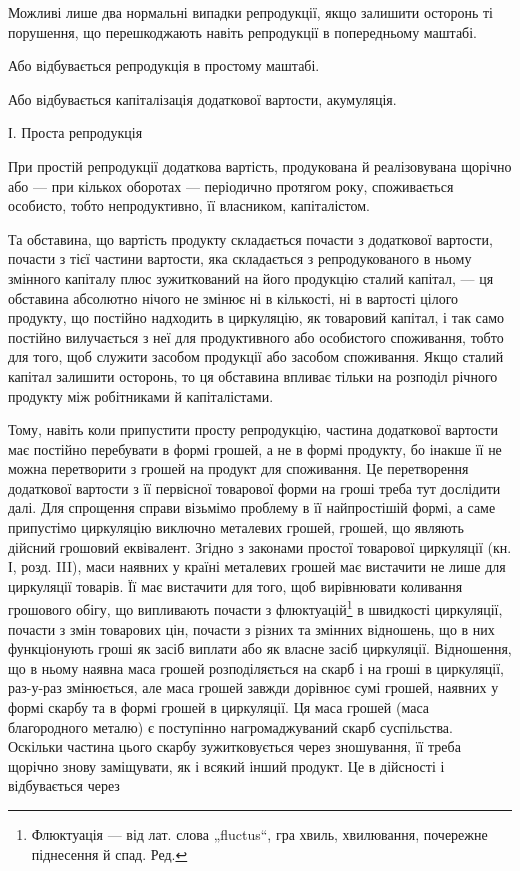 Можливі лише два нормальні випадки репродукції, якщо залишити
осторонь ті порушення, що перешкоджають навіть репродукції в попередньому
маштабі.

Або відбувається репродукція в простому маштабі.

Або відбувається капіталізація додаткової вартости, акумуляція.

І. Проста репродукція

При простій репродукції додаткова вартість, продукована й реалізовувана
щорічно або — при кількох оборотах — періодично протягом року,
споживається особисто, тобто непродуктивно, її власником, капіталістом.

Та обставина, що вартість продукту складається почасти з додаткової
вартости, почасти з тієї частини вартости, яка складається з репродукованого
в ньому змінного капіталу плюс зужиткований на його продукцію
сталий капітал, — ця обставина абсолютно нічого не змінює ні в кількості,
ні в вартості цілого продукту, що постійно надходить в циркуляцію, як
товаровий капітал, і так само постійно вилучається з неї для продуктивного
або особистого споживання, тобто для того, щоб служити засобом
продукції або засобом споживання. Якщо сталий капітал залишити осторонь,
то ця обставина впливає тільки на розподіл річного продукту між
робітниками й капіталістами.

Тому, навіть коли припустити просту репродукцію, частина додаткової
вартости має постійно перебувати в формі грошей, а не в формі
продукту, бо інакше її не можна перетворити з грошей на продукт для
споживання. Це перетворення додаткової вартости з її первісної товарової
форми на гроші треба тут дослідити далі. Для спрощення справи
візьмімо проблему в її найпростішій формі, а саме припустімо циркуляцію
виключно металевих грошей, грошей, що являють дійсний грошовий еквівалент.
Згідно з законами простої товарової циркуляції (кн. І, розд. III), маси
наявних у країні металевих грошей має вистачити не лише для
циркуляції товарів. Її має вистачити для того, щоб вирівнювати коливання
грошового обігу, що випливають почасти з флюктуацій\footnote*{
Флюктуація — від лат. слова „fluctus“, гра хвиль, хвилювання, почережне
піднесення й спад. Ред.
} в швидкості
циркуляції, почасти з змін товарових цін, почасти з різних та
змінних відношень, що в них функціонують гроші як засіб виплати або
як власне засіб циркуляції. Відношення, що в ньому наявна маса грошей
розподіляється на скарб і на гроші в циркуляції, раз-у-раз змінюється, але
маса грошей завжди дорівнює сумі грошей, наявних у формі скарбу та
в формі грошей в циркуляції. Ця маса грошей (маса благородного металю)
є поступінно нагромаджуваний скарб суспільства. Оскільки частина цього
скарбу зужитковується через зношування, її треба щорічно знову заміщувати,
як і всякий інший продукт. Це в дійсності і відбувається через